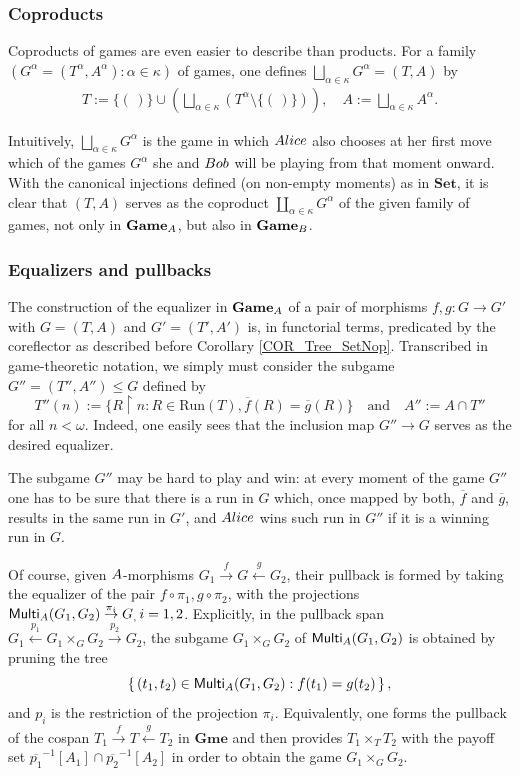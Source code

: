 \documentclass[12pt]{amsart}
\theoremstyle{definition}
\newcommand{\set}[1]{\left\{\, {#1} \,\right\}}
\newcommand{\seq}[1]{{\left( {#1} \right)}}
\newcommand{\ali}{\textup{\textmd{\textsc{Alice}}}}
\newcommand{\bob}{\textup{\textmd{\textsc{Bob}}}}
\newcommand{\A}{\textup{\textmd{\textsc{A}}}}
\newcommand{\B}{\textup{\textmd{\textsc{B}}}}
\newcommand{\Sets}{\mathbf{Set}}
\newcommand{\Games}{\mathbf{Game}}
\newcommand{\Gmes}{\mathbf{Gme}}
\newcommand{\Multi}{\mathsf{Multi}}
\begin{document}
\subsubsection{Coproducts}\label{SUBSECT_coproducts} Coproducts of games are even easier to describe than products.
For a family $\left(G^{\alpha}=(T^{\alpha},A^{\alpha}):\alpha\in \kappa\right)$ of games, one defines $\bigsqcup_{\alpha\in \kappa}G^{\alpha}=(T,A)$ by
\begin{gather*}
	T:=\{\seq{\,}\}\cup\left(\bigsqcup_{\alpha\in \kappa}\left(T^{\alpha}\setminus\{\seq{\,}\}\right)\right),\quad
	A:=\bigsqcup_{\alpha\in \kappa}A^{\alpha}.
\end{gather*}

Intuitively, $\bigsqcup_{\alpha\in \kappa}G^{\alpha}$ is the game in which $\ali$ also chooses at her first move which of the games $G^{\alpha}$ she and $\bob$ will be playing from that moment onward. With the canonical injections defined (on non-empty moments) as in $\Sets$, it is clear that $(T,A)$ serves as the coproduct $\coprod_{\alpha\in\kappa} G^{\alpha}$ of the given family of games, not only in $\Games_\A$, but also in $\Games_\B$.



\subsubsection{Equalizers and pullbacks}\label{SUBSECeqpb} The construction of the equalizer in $\Games_{\A}$ of a pair of morphisms $f,g\colon G\to G'$ with $G=(T,A)$ and $G'=(T',A')$ is, in functorial terms, predicated by the coreflector as described before Corollary  \ref{COR_Tree_SetNop}. Transcribed in game-theoretic notation, we simply must consider the subgame $G''=(T'',A'')\leq G$ defined by
\[T''(n):=\{ R\upharpoonright n: R\in\mathrm{Run}(T), \overline{f}(R)=\overline{g}(R)\}\quad\text{and}\quad A'':=A\cap T''\]
for all $n<\omega$. Indeed, one easily sees that the inclusion map $G''\to G$ serves as the desired equalizer.

The subgame $G''$ may be hard to play and win: at every moment of the game $G''$ one has to be sure that there is a run in $G$ which, once mapped by both,  $\overline{f}$ and $\overline{g}$, results in the same run in $G'$, and $\ali$ wins such run in $G''$ if it is a winning run in $G$.

Of course, given $\A$-morphisms $G_1\stackrel{f}{\to}G\stackrel{g}{\leftarrow}G_2$, their pullback is formed by taking the equalizer 
of the pair $f\circ \pi_1, g\circ \pi_2$,
with the projections 
$\Multi_{\A}(G_1,G_2)\stackrel{\pi_i}{\to} G_,\,i=1,2$. 
Explicitly, in the pullback span $G_1\stackrel{p_1}{\leftarrow}G_1\times_G  G_2 \stackrel{p_2}{\to} G_2$, the subgame $G_1\times_G  G_2$ of $\Multi_{\A}(G_1,G_2)$ is
obtained by pruning the tree 
\[
\set{(t_1,t_2)\in \Multi_{\A}(G_1,G_2): f(t_1)=g(t_2)},
\]
and $p_i$ is the restriction of the projection $\pi_i$. Equivalently, one forms the pullback of the cospan
$T_1\stackrel{f}{\to}T\stackrel{g}{\leftarrow}T_2$ in $\Gmes$ and then provides $T_1\times_T T_2$ with the payoff set $\overline{p_1}^{-1}[A_1]\cap \overline{p_2}^{-1}[A_2]$ in order to obtain the game $G_1\times_G  G_2$.
\end{document}
